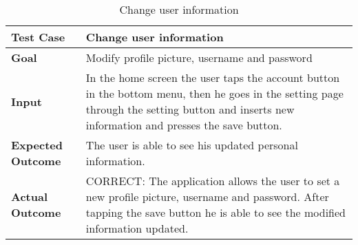 \begin{table}[H]
	\centering
	\begin{tabular}{|l|l|}
	\hline
	\textbf{Test Case}& Change user information\\
	\hline
	\textbf{Goal}& Modify profile picture, username and password\\
	\hline
	\textbf{Input}& 
	\begin{minipage}{.7\linewidth}
	In the home screen the user taps the account button in the bottom menu, then he goes in the setting page through the setting button and inserts new information and presses the save button.
	\end{minipage}\\
	\hline
	\textbf{Expected Outcome}& The user is able to see his updated personal information.\\
	\hline
	\textbf{Actual Outcome}& 
	\begin{minipage}{.7\linewidth}
	CORRECT: The application allows the user to set a new profile picture, username and password. After tapping the save button he is able to see the modified information updated.
	\end{minipage}\\
	\hline	
	\end{tabular}
	\caption{Change user information}
\end{table}